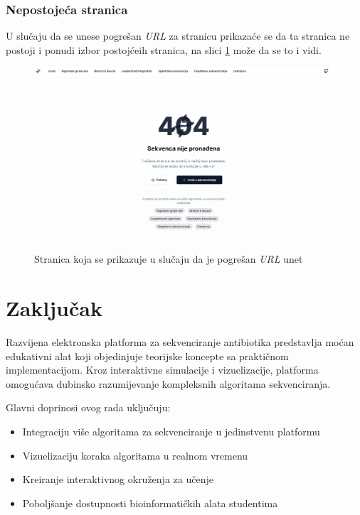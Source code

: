 \documentclass[12pt,oneside]{memoir}
\begin{document}
\subsection{Nepostojeća stranica}

U slučaju da se unese pogrešan \emph{URL} za stranicu prikazaće se da ta stranica ne postoji i ponudi izbor postojćeih stranica, na slici \ref{fig:wrong_page} može da se to i vidi.

\begin{figure}[H]
\centering
\includegraphics[width=1\textwidth]{images/wrong_page.png}
\caption{Stranica koja se prikazuje u slučaju da je pogrešan \emph{URL} unet}
\label{fig:wrong_page}
\end{figure}

\chapter{Zaključak}

Razvijena elektronska platforma za sekvenciranje antibiotika predstavlja moćan edukativni alat koji objedinjuje teorijske koncepte sa praktičnom implementacijom. Kroz interaktivne simulacije i vizuelizacije, platforma omogućava dubinsko razumijevanje kompleksnih algoritama sekvenciranja.

Glavni doprinosi ovog rada uključuju:
\begin{itemize}
    \item Integraciju više algoritama za sekvenciranje u jedinstvenu platformu
    \item Vizuelizaciju koraka algoritama u realnom vremenu
    \item Kreiranje interaktivnog okruženja za učenje
    \item Poboljšanje dostupnosti bioinformatičkih alata studentima
\end{itemize}
\end{document}
